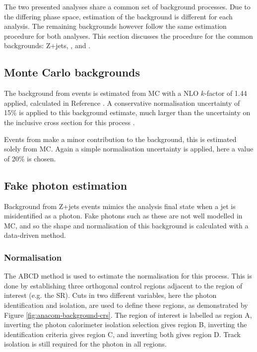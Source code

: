 \newcommand\nxzj[2]{\ensuremath{N_{#1,\text{#2}}^\text{Z+jets}}}

The two presented analyses share a common set of background processes. Due to
the differing phase space, estimation of the \QCDZy background is
different for each analysis. The remaining backgrounds however follow the same
estimation procedure for both analyses. This section discusses the procedure for
the common backgrounds: Z+jets, \tty, and \WZjj.

\subsection{Monte Carlo backgrounds}
\label{sec:methods-backgrounds-mc}

The background from \tty events is estimated from \ac{MC} with a \ac{NLO}
$k$-factor of 1.44 applied, calculated in Reference \cite{ATLAStty2019}.
A conservative normalisation uncertainty of 15\% is applied to this background
estimate, much larger than the uncertainty on the inclusive cross section for
this process \cite{ATLAStty2019}.

Events from \WZjj make a minor contribution to the background, this is
estimated solely from \ac{MC}. Again a simple normalisation uncertainty is
applied, here a value of 20\% is chosen.

\subsection{Fake photon estimation}
\label{sec:methods-backgrounds-fakephoton}

Background from Z+jets events mimics the analysis final state when a jet is
misidentified as a photon. Fake photons such as these are not well modelled in
\ac{MC}, and so the shape and normalisation of this background is
calculated with a data-driven method.

\subsubsection{Normalisation}

The ABCD method is used to estimate the normalisation for this process. This is
done by establishing three orthogonal control regions adjacent to the region of
interest (e.g. the \ac{SR}). Cuts in two different variables, here the photon
identification and isolation, are used to define these regions, as demonstrated
by Figure \ref{fig:anacom-background-crs}.  The region of interest is labelled
as region A, inverting the photon calorimeter isolation selection gives region
B, inverting the identification criteria gives region C, and inverting both
gives region D.  Track isolation is still required for the photon in all
regions.

